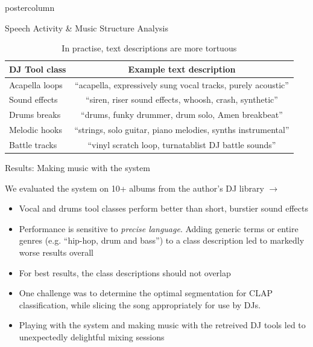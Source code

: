 \documentclass{beamer}
\begin{document}
\begin{frame}
\begin{columns}
\begin{column}{.57\textwidth}
\begin{beamercolorbox}[center]{postercolumn}
\begin{minipage}{.98\textwidth}
{\begin{myblock}{Speech Activity \& Music Structure Analysis}
			
			\begin{table}
			 \begin{center}
			 \begin{tabular}{lc}
			  \midrule
			  \textbf{DJ Tool class} & \textbf{Example text description} \\
			  \midrule
				Acapella loops & ``acapella, expressively sung vocal tracks, purely acoustic''  \\
				Sound effects &  ``siren, riser sound effects, whoosh, crash, synthetic''\\
				Drums breaks  & ``drums, funky drummer, drum solo, Amen breakbeat''  \\
				Melodic hooks & ``strings, solo guitar, piano melodies, synths instrumental''  \\
				Battle tracks & ``vinyl scratch loop, turnatablist DJ battle sounds''   \\
			 \end{tabular}
			\end{center}
			 \caption{In practise, text descriptions are more tortuous}
			 \label{tab:djtool_texts}
			\end{table}
			
		\end{myblock}\vfill
					
					
					\begin{myblock}{Results: Making music with the system}

					We evaluated the system on 10+ albums from the author's DJ library $\rightarrow$ 

						\begin{itemize}
							\item Vocal and drums tool classes perform better than short, burstier sound effects 							
							\item Performance is sensitive to \textit{precise language}. Adding generic terms or entire genres (e.g. ``hip-hop, drum and bass'') to a class description led to markedly worse results overall
							\item For best results, the class descriptions should not overlap
							\item One challenge was to determine the optimal segmentation for CLAP classification, while slicing the song appropriately for use by DJs.
							\item Playing with the system and making music with the retreived DJ tools led to unexpectedly delightful mixing sessions
						\end{itemize}
	\end{myblock}\vfill
					
}
\end{minipage}
\end{beamercolorbox}
\end{column}
\end{columns}
\end{frame}
\end{document}
